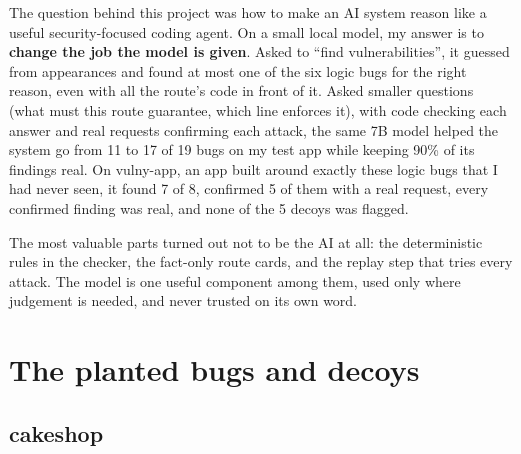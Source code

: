 \documentclass[11pt,a4paper]{article}
\begin{document}
The question behind this project was how to make an AI system reason like a useful security-focused coding agent. On a small local model,
my answer is to \textbf{change the job the model is given}. Asked to ``find vulnerabilities'', it guessed from
appearances and found at most one of the six logic bugs for the right reason, even with all the route's code
in front of it. Asked smaller questions (what must this route
guarantee, which line enforces it), with code checking each answer and real requests confirming each attack, the same
7B model helped the system go from 11 to 17 of 19 bugs on my test app while keeping 90\% of its findings real.
On vulny-app, an app built around exactly these logic bugs that I had never seen, it found 7 of 8, confirmed 5 of
them with a real request, every confirmed finding was real, and none of the 5 decoys was flagged.

The most valuable parts turned out not to be the AI at all: the deterministic rules in the checker, the fact-only route
cards, and the replay step that tries every attack. The model is one useful component among them, used only where
judgement is needed, and never trusted on its own word.

\appendix
\section{The planted bugs and decoys}
\label{app:bugs}

\subsection{cakeshop}
\end{document}
